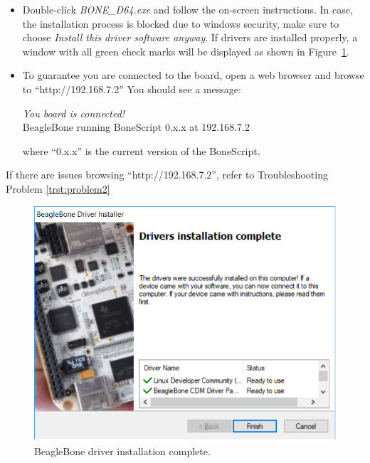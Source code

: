 \begin{mdframed}[frametitle=Install BeagleBone Driver and Browse BeagleBone's webserver, backgroundcolor=yellow!5, roundcorner=7pt,outerlinecolor= blue!70!black,outerlinewidth=1.2]
  \begin{itemize}
  \item   Double-click \emph{BONE\_D64.exe} and follow the on-screen instructions. In case, the installation process is blocked due to windows security, make sure to choose \emph{Install this driver software anyway}. If drivers are installed properly, a window with all green check marks will be displayed as shown in Figure~\ref{fig:BBBlue-DriverInstalation}.
    
  \item To guarantee you are connected to the board, open a web browser and browse to ``http://192.168.7.2'' You should see a message:

    \emph{You board is connected!}\\
    \noindent BeagleBone running BoneScript 0.x.x at 192.168.7.2 

where ``0.x.x'' is the current version of the BoneScript. 
  \end{itemize}
  
\end{mdframed}

If there are issues browsing  ``http://192.168.7.2'', refer to Troubleshooting Problem \ref{trst:problem2}

  \begin{figure}
    \centering
    \includegraphics[scale=0.5]{figs/img/Lab0/BBB-DriverInstalation}
    \caption{BeagleBone driver installation complete.}
    \label{fig:BBBlue-DriverInstalation}
  \end{figure}
%

